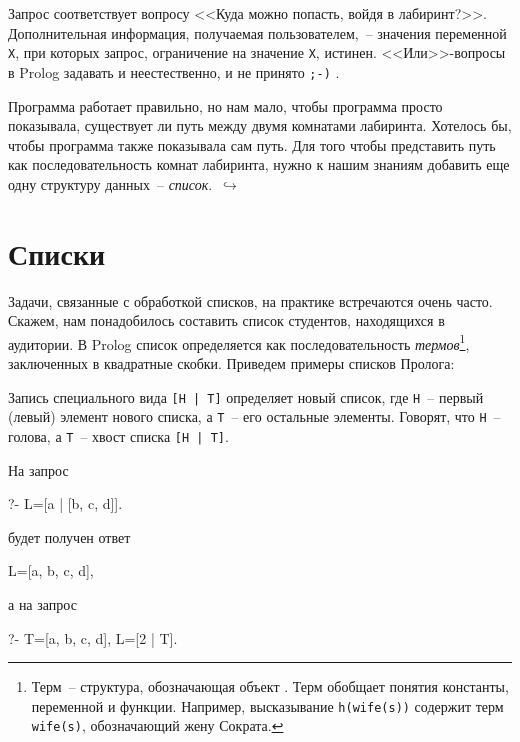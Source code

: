 \documentclass[a4paper,14pt, openany, twoside, final]{extbook} %
\newcommand{\goforth}[1]{$\,\hookrightarrow$\pageref{#1}}
\begin{document}
Запрос соответствует вопросу <<Куда можно попасть, войдя в лабиринт?>>.  Дополнительная информация, получаемая пользователем,~-- значения переменной \texttt{X}, при которых запрос, ограничение на значение \texttt{X}, истинен.  <<Или>>-вопросы в Prolog задавать и неестественно, и не принято \texttt{;-)} .

Программа работает правильно, но нам мало, чтобы программа просто показывала, существует ли путь между двумя комнатами лабиринта.  Хотелось бы, чтобы программа также показывала сам путь.  Для того чтобы представить путь как последовательность комнат лабиринта, нужно к нашим знаниям добавить еще одну структуру данных~-- \emph{список}. \goforth{par:mazelist}

\section{Списки}

Задачи, связанные с обработкой списков, на практике встречаются очень часто. Скажем, нам понадобилось составить список студентов, находящихся в аудитории.  В Prolog список определяется как последовательность \emph{термов}\footnote{Терм~-- структура, обозначающая объект \cite{DDW}.  Терм обобщает понятия константы, переменной и функции.  Например, высказывание \texttt{h(wife(s))} содержит терм \texttt{wife(s)}, обозначающий жену Сократа.}, заключенных в квадратные скобки.  Приведем примеры списков Пролога:

\begin{proexp}
\end{proexp}

  Запись специального вида {\tt [H | T]} определяет новый список, где {\tt Н}~-- первый (левый) элемент нового списка, а {\tt Т}~-- его остальные элементы.  Говорят, что {\tt Н}~-- голова, а {\tt Т}~-- хвост списка {\tt [H | T]}.\enlargethispage{-2em}

\noindent{}На запрос

\begin{proexp}
?- L=[a | [b, c, d]].
\end{proexp}

\noindent будет получен ответ

\begin{proexp}
L=[a, b, c, d],
\end{proexp}

\noindent а на запрос

\begin{proexp}
?- T=[a, b, c, d], L=[2 | T].
\end{proexp}
\end{document}
